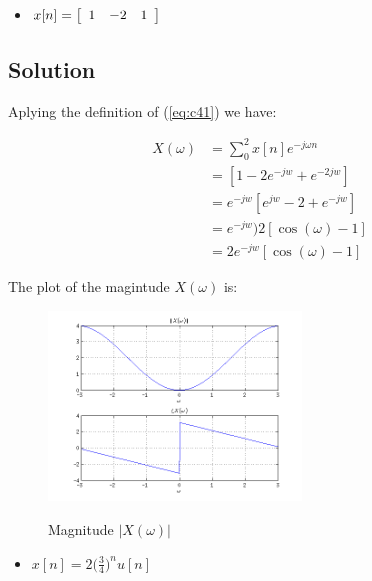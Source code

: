 \begin{itemize}
\item 
$x[n] =
\left[ \begin{array}{c c c}
1 & -2 & 1
\end{array} \right] $
\end{itemize} 

\subsection*{Solution}

Aplying the definition of (\ref{eq:c41}) we have:

\begin{equation}
\begin{aligned}
X(\omega) &= \displaystyle\sum_{0}^{2} x[n] e^{-j \omega n} \\
&= [1 - 2e^{-jw} + e^{-2jw} ] \\
&= e^{-jw} [e^{jw} - 2 + e^{-jw} ] \\
&= e^{-jw}) 2[ \cos(\omega) - 1 ] \\
&= 2e^{-jw}[ \cos(\omega) - 1 ] 
\end{aligned}
\label{eq:c4p1b}
\end{equation} 

The plot of the magintude $X(\omega)$ is:

\begin{figure}[H]
\caption{Magnitude $|X(\omega)|$}
\centering
\includegraphics[width=0.6\textwidth]{figs/c4p1b.png}
\label{fig:c4p1b}
\end{figure} 

\begin{itemize}
\item 
$x[n] =2\big(\frac{3}{4}\big)^n u[n] $
\end{itemize} 

